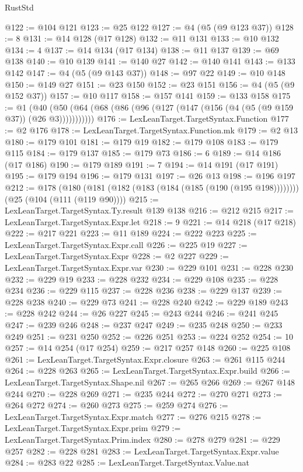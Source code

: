 \begin{lexlean}{RustStd}
\begin{coremodule}
@122 := @104 @121
@123 := @25 @122
@127 := @4 (@5 (@9 @123 @37))
@128 := 8
@131 := @14 @128 (@17 @128)
@132 := @11 @131
@133 := @10 @132
@134 := 4
@137 := @14 @134 (@17 @134)
@138 := @11 @137
@139 := @69 @138
@140 := @10 @139
@141 := @140 @27
@142 := @140 @141
@143 := @133 @142
@147 := @4 (@5 (@9 @143 @37))
@148 := @97 @22
@149 := @10 @148
@150 := @149 @27
@151 := @23 @150
@152 := @23 @151
@156 := @4 (@5 (@9 @152 @37))
@157 := @10 @117
@158 := @157 @141
@159 := @133 @158
@175 := @1 (@40 (@50 (@64 (@68 (@86 (@96 (@127 (@147 (@156 (@4 (@5 (@9 @159 @37)) (@26 @3)))))))))))
@176 := LexLeanTarget.TargetSyntax.Function
@177 := @2 @176
@178 := LexLeanTarget.TargetSyntax.Function.mk
@179 := @2 @13
@180 := @179 @101
@181 := @179 @19
@182 := @179 @108
@183 := @179 @115
@184 := @179 @137
@185 := @179 @73
@186 := 6
@189 := @14 @186 (@17 @186)
@190 := @179 @189
@191 := 7
@194 := @14 @191 (@17 @191)
@195 := @179 @194
@196 := @179 @131
@197 := @26 @13
@198 := @196 @197
@212 := @178
    (@180 (@181 (@182 (@183 (@184 (@185 (@190 (@195 @198))))))))
    (@25 (@104 (@111 (@119 @90))))
@215 := LexLeanTarget.TargetSyntax.Ty.result @139 @138
@216 := @212 @215
@217 := LexLeanTarget.TargetSyntax.Expr.let
@218 := 9
@221 := @14 @218 (@17 @218)
@222 := @217 @221
@223 := @11 @189
@224 := @222 @223
@225 := LexLeanTarget.TargetSyntax.Expr.call
@226 := @225 @19
@227 := LexLeanTarget.TargetSyntax.Expr
@228 := @2 @227
@229 := LexLeanTarget.TargetSyntax.Expr.var
@230 := @229 @101
@231 := @228 @230
@232 := @229 @19
@233 := @228 @232
@234 := @229 @108
@235 := @228 @234
@236 := @229 @115
@237 := @228 @236
@238 := @229 @137
@239 := @228 @238
@240 := @229 @73
@241 := @228 @240
@242 := @229 @189
@243 := @228 @242
@244 := @26 @227
@245 := @243 @244
@246 := @241 @245
@247 := @239 @246
@248 := @237 @247
@249 := @235 @248
@250 := @233 @249
@251 := @231 @250
@252 := @226 @251
@253 := @224 @252
@254 := 10
@257 := @14 @254 (@17 @254)
@259 := @217 @257 @148
@260 := @225 @108
@261 := LexLeanTarget.TargetSyntax.Expr.closure
@263 := @261 @115 @244
@264 := @228 @263
@265 := LexLeanTarget.TargetSyntax.Expr.build
@266 := LexLeanTarget.TargetSyntax.Shape.nil
@267 := @265 @266
@269 := @267 @148 @244
@270 := @228 @269
@271 := @235 @244
@272 := @270 @271
@273 := @264 @272
@274 := @260 @273
@275 := @259 @274
@276 := LexLeanTarget.TargetSyntax.Expr.match
@277 := @276 @215
@278 := LexLeanTarget.TargetSyntax.Expr.prim
@279 := LexLeanTarget.TargetSyntax.Prim.index
@280 := @278 @279
@281 := @229 @257
@282 := @228 @281
@283 := LexLeanTarget.TargetSyntax.Expr.value
@284 := @283 @22
@285 := LexLeanTarget.TargetSyntax.Value.nat

\end{coremodule}
\end{lexlean}
